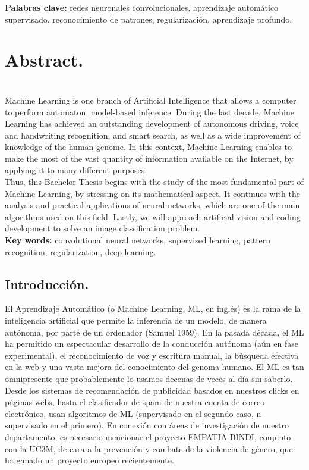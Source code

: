 \documentclass[a4paper,11pt]{article}
\begin{document}
\textbf{Palabras clave:} redes neuronales convolucionales, aprendizaje automático supervisado, reconocimiento de patrones, regularización, aprendizaje profundo.

\newpage

\chapter{\textbf{\large Abstract.}}\\


Machine Learning is one branch of Artificial Intelligence that allows a computer to perform automaton, model-based inference. During the last decade, Machine Learning has achieved an outstanding development of autonomous driving, voice and handwriting recognition, and smart search, as well as a wide improvement of knowledge of the human genome. In this context, Machine Learning enables to make the most of the vast quantity of information available on the Internet, by applying it to many different purposes. \\

\noindent
Thus, this Bachelor Thesis begins with the study of the most fundamental part of Machine Learning, by stressing on its mathematical aspect. It continues with the analysis and practical applications of neural networks, which are one of the main algorithms used on this field. Lastly, we will approach artificial vision and coding development to solve an image classification problem.\\


\textbf{Key words:} convolutional neural networks, supervised learning, pattern recognition, regularization, deep learning.



\newpage
\section{Introducción.}
El Aprendizaje Automático (o Machine Learning, ML, en inglés) es la rama de la inteligencia artificial que permite la inferencia de un modelo, de manera autónoma, por parte de un ordenador (Samuel 1959). En la pasada década, el ML ha permitido un espectacular desarrollo de la conducción autónoma (aún en fase experimental), el reconocimiento de voz y escritura manual, la búsqueda efectiva en la web y una vasta mejora del conocimiento del genoma humano. El ML es tan omnipresente que probablemente lo usamos decenas de veces al día sin saberlo. Desde los sistemas de recomendación de publicidad basados en nuestros clicks en páginas webs, hasta el clasificador de spam de nuestra cuenta de correo electrónico, usan algoritmos de ML (supervisado en el segundo caso, n -supervisado en el primero). En conexión con áreas de investigación de nuestro departamento, es necesario mencionar el proyecto EMPATIA-BINDI, conjunto con la UC3M, de cara a la prevención y combate de la violencia de género, que ha ganado un proyecto europeo recientemente.\\
\end{document}

